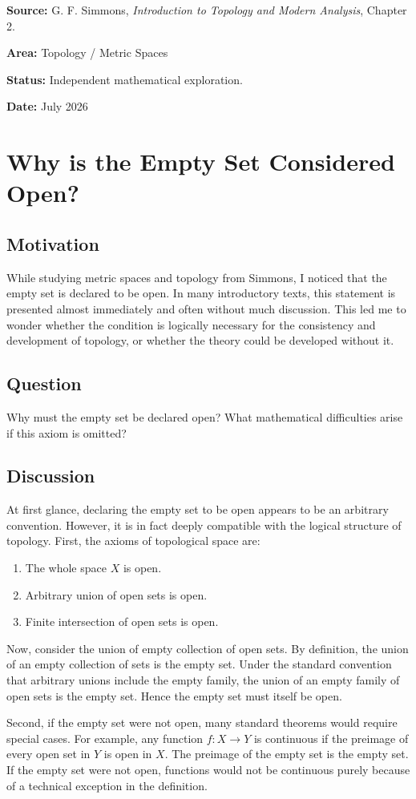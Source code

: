 \noindent\textbf{Source:} G. F. Simmons, \emph{Introduction to Topology and Modern Analysis}, Chapter 2.

\noindent\textbf{Area:} Topology / Metric Spaces

\noindent\textbf{Status:} Independent mathematical exploration.

\noindent\textbf{Date:} July 2026
\section{Why is the Empty Set Considered Open?}
\subsection*{Motivation}
While studying metric spaces and topology from Simmons, I noticed that the empty set is declared to be open. In many introductory texts, this statement is presented almost immediately and often without much discussion. This led me to wonder whether the condition is logically necessary for the consistency and development of topology, or whether the theory could be developed without it.
\subsection*{Question}
Why must the empty set be declared open? What mathematical difficulties arise if this axiom is omitted? 
\subsection*{Discussion}
At first glance, declaring the empty set to be open appears to be an arbitrary convention. However, it is in fact deeply compatible with the logical structure of topology. First, the axioms of topological space are:
\begin{enumerate}
    \item The whole space $X$ is open.
    \item Arbitrary union of open sets is open.
    \item Finite intersection of open sets is open.
\end{enumerate}
Now, consider the union of empty collection of open sets. By definition, the union of an empty collection of sets is the empty set. Under the standard convention that arbitrary unions include the empty family, the union of an empty family of open sets is the empty set. Hence the empty set must itself be open.

Second, if the empty set were not open, many standard theorems would require special cases. For example, any function $f: X \to Y$ is continuous if the preimage of every open set in $Y$ is open in $X$. The preimage of the empty set is the empty set. If the empty set were not open, functions would not be continuous purely because of a technical exception in the definition.

